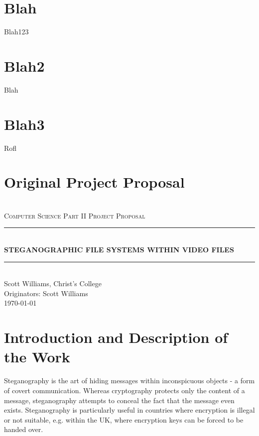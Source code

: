 \documentclass[paper=a4, fontsize=11pt,twoside]{scrartcl}    %
\makeatletter
\numberwithin{table}{section}
\numberwithin{figure}{section}
\numberwithin{algorithm}{section}
\newcommand{\HRule}[1]{\rule{\linewidth}{#1}}
\def\printauthor{%
    {\large \@author}}
\makeatother
\begin{document}
\pagebreak

\appendix
\section{Blah} 
\label{app:a}

Blah123

\section{Blah2} 
\label{app:b}

Blah

\section{Blah3} 
\label{app:c}

Rofl

\vfill

\section{Original Project Proposal} 

\begin{center}	
 	~\\[2.0cm]			
	\normalsize \textsc{Computer Science Part II Project Proposal}\\[2.0cm]     
    \HRule{0.5pt} \\                        
    \LARGE \textbf{\uppercase{Steganographic file systems within video files}}    
    \HRule{2pt} \\[30pt]        
    \normalsize Scott Williams, Christ's College\\[2pt]Originators: Scott Williams\\[25pt]           
    \normalsize \today            
     \vfill
\end{center}
\printauthor                
\newpage
\section*{Introduction and Description of the Work}

Steganography is the art of hiding messages within inconspicuous objects - a form of covert communication. Whereas cryptography protects only the content of a message, steganography attempts to conceal the fact that the message even exists. Steganography is particularly useful in countries where encryption is illegal or not suitable, e.g. within the UK, where encryption keys can be forced to be handed over.
\end{document}
